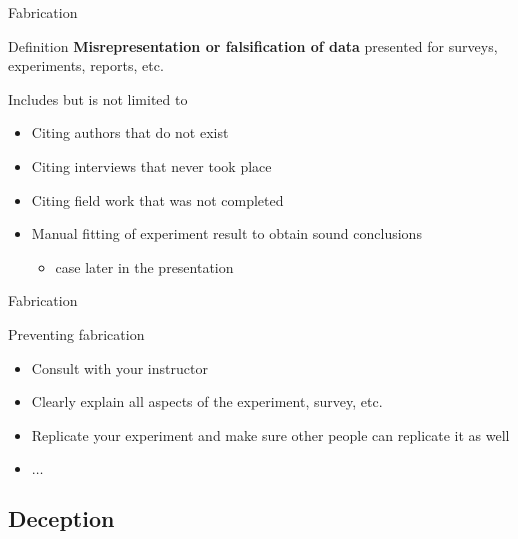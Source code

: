 		\begin{frame}{Fabrication}
			
			\begin{block}{Definition}
				\textbf{Misrepresentation or falsification of data} presented for surveys, experiments, reports, etc.

				Includes but is not limited to

				\begin{itemize}
					\item
						Citing authors that do not exist
					\item 
						Citing interviews that never took place
					\item
						Citing field work that was not completed
					\item 
						Manual fitting of experiment result to obtain sound conclusions
						\begin{itemize}
							\item 
								case later in the presentation
						\end{itemize}
				\end{itemize}

			\end{block}

		\end{frame}

		\begin{frame}{Fabrication}
			
			Preventing fabrication

			\begin{itemize}
				\item 
					Consult with your instructor
				\item 
					Clearly explain all aspects of the experiment, survey, etc.
				\item 
					Replicate your experiment and make sure other people can replicate it as well
				\item 
					$\ldots$
			\end{itemize}

		\end{frame}

	\subsection{Deception}

